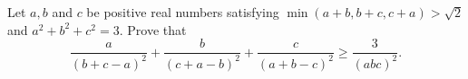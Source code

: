 Let 
$a,b$
 and 
$c$
 be positive real numbers satisfying 
$\min(a+b,b+c,c+a) > \sqrt{2}$
 and 
$a^2+b^2+c^2=3.$
 Prove that
\[\frac{a}{(b+c-a)^2} + \frac{b}{(c+a-b)^2} + \frac{c}{(a+b-c)^2} \geq \frac{3}{(abc)^2}.\]
